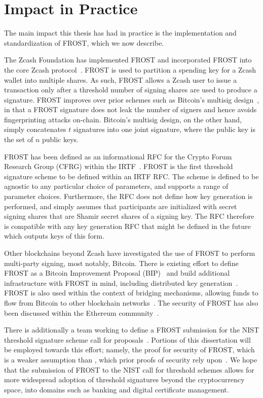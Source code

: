 \section{Impact in Practice}
\label{intro:impact}

The main impact this thesis has had in practice is the implementation and standardization of FROST,
which we now describe.

The Zcash Foundation has implemented FROST and incorporated FROST into the core Zcash protocol~\cite{ZcashFROSTImpl,ZcashFROSTZip}.
FROST is used to partition a spending key for a Zcash wallet into multiple shares.
As such,
FROST allows a Zcash user to issue a transaction only after a threshold number of signing shares are used to produce a signature.
FROST improves over prior schemes such as Bitcoin's multisig design~\cite{BitcoinMultisig},
in that a FROST signature does not leak the number of signers and hence avoids fingerprinting attacks on-chain.
Bitcoin's multisig design,
on the other hand,
simply concatenates $t$ signatures into one joint signature,
where the public key is the set of $n$ public keys.

FROST has been defined as an informational RFC for the Crypto Forum Research Group (CFRG) within the IRTF~\cite{Connolly22}.
FROST is the first threshold signature scheme to be defined within an IRTF RFC.
The scheme is defined to be agnostic to any particular choice of parameters,
and supports a range of parameter choices.
Furthermore,
the RFC does not define how key generation is performed,
and simply assumes that participants are initialized with secret signing shares that are Shamir secret shares of a signing key.
The RFC therefore is compatible with any key generation RFC that might be defined in the future which outputs keys of this form.

Other blockchains beyond Zcash have investigated the use of FROST to perform multi-party signing,
most notably, Bitcoin.
There is existing effort to define FROST as a Bitcoin Improvement Proposal (BIP)~\cite{FROSTBip} and build additional infrastructure with FROST in mind,
including distributed key generation~\cite{ChillDKG}.
FROST is also used within the context of bridging mechanisms,
allowing funds to flow from Bitcoin to other blockchain networks~\cite{ArchFROST}.
The security of FROST has also been discussed within the Ethereum community~\cite{FROSTEthereum}.

There is additionally a team working to define a FROST submission for the NIST threshold signature scheme call for proposals~\cite{NIST22,NIST23}.
Portions of this dissertation will be employed towards this effort;
namely,
the proof for \AOMDL security of FROST,
which is a weaker assumption than \OMDL,
which prior proofs of security rely upon~\cite{BellareCKMTZ22}.
We hope that the submission of FROST to the NIST call for threshold schemes allows for more widespread adoption of threshold signatures beyond the cryptocurrency space,
into domains such as banking and digital certificate management.
